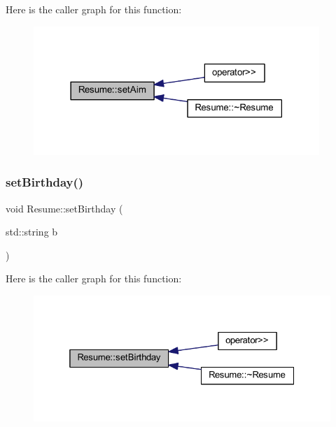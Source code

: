 Here is the caller graph for this function\+:
\nopagebreak
\begin{figure}[H]
\begin{center}
\leavevmode
\includegraphics[width=306pt]{class_resume_a48d6e397c93b741a2fe96ba83f36c40f_icgraph}
\end{center}
\end{figure}
\hypertarget{class_resume_abc51f92eaaab42d9973693424147a421}{}\label{class_resume_abc51f92eaaab42d9973693424147a421} 
\subsubsection{\texorpdfstring{set\+Birthday()}{setBirthday()}}
{\footnotesize\ttfamily void Resume\+::set\+Birthday (\begin{DoxyParamCaption}\item[{std\+::string}]{b }\end{DoxyParamCaption})}

Here is the caller graph for this function\+:
\nopagebreak
\begin{figure}[H]
\begin{center}
\leavevmode
\includegraphics[width=325pt]{class_resume_abc51f92eaaab42d9973693424147a421_icgraph}
\end{center}
\end{figure}
\hypertarget{class_resume_adce5a6624de56751c72f8fe2989da5c9}{}\label{class_resume_adce5a6624de56751c72f8fe2989da5c9} 
